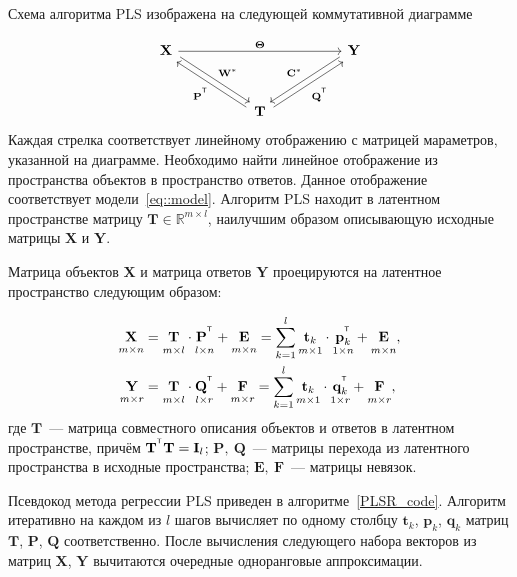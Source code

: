 \documentclass[12pt,twoside]{article}
\newcommand{\bY}{\mathbf{Y}}
\newcommand{\bX}{\mathbf{X}}
\newcommand{\bt}{\mathbf{t}}
\newcommand{\bp}{\mathbf{p}}
\newcommand{\bq}{\mathbf{q}}
\newcommand{\bP}{\mathbf{P}}
\newcommand{\bT}{\mathbf{T}}
\newcommand{\bQ}{\mathbf{Q}}
\newcommand{\bC}{\mathbf{C}}
\newcommand{\bE}{\mathbf{E}}
\newcommand{\bF}{\mathbf{F}}
\newcommand{\bW}{\mathbf{W}}
\newcommand{\bI}{\mathbf{I}}
\newcommand{\bTheta}{\boldsymbol{\Theta}}
\begin{document}
Схема алгоритма PLS изображена на следующей коммутативной диаграмме

\[
\begin{tikzcd}[column sep=5em, row sep=3em]
\bX
\arrow[]{rr}{\bTheta}
\arrow[shift left=0.5ex]{dr}{\bW^*}
& & \bY
\arrow[swap, shift right=0.5ex]{dl}{\bC^*}
\\
& \bT
\arrow[shift left=0.5ex]{ul}{\bP^{\T}}
\arrow[swap, shift right=0.5ex]{ur}{\bQ^{\T}}
\end{tikzcd}
\]
Каждая стрелка соответствует линейному отображению с матрицей мараметров, указанной на диаграмме.
Необходимо найти линейное отображение из пространства объектов в пространство ответов. 
Данное отображение соответствует модели~\eqref{eq::model}. 
Алгоритм PLS находит в латентном пространстве матрицу $\bT \in \mathbb{R}^{m \times l}$, наилучшим образом описывающую исходные матрицы $\bX$ и $\bY$.

Матрица объектов $\bX$ и матрица ответов $\bY$ проецируются на латентное пространство следующим образом:

\begin{align}
\label{eq::PLS_X}
 \underset{m \times n}{\vphantom{\bQ}\bX} 
 &= \underset{m \times l}{\vphantom{\bQ}\bT} \cdot \underset{l \times n}{\vphantom{\bQ}\bP^{\T}} + \underset{m \times n}{\vphantom{\bQ}\bE} 
 = \sum_{k=1}^l \underset{m \times 1}{\vphantom{\bp_k^{\T}}\bt_k} \cdot \underset{1 \times n}{\bp_k^{\T}} + \underset{m \times n}{\vphantom{\bp_k^{\T}}\bE},\\
 \label{eq::PLS_Y}
 \underset{m \times r}{\vphantom{\bQ}\bY} 
 &= \underset{m \times l}{\vphantom{\bQ}\bT} \cdot \underset{l \times r}{\bQ^{\T}} + \underset{m \times r}{\vphantom{\bQ}\bF}
 =  \sum_{k=1}^l  \underset{m \times 1}{\vphantom{\bq_k^{\T}}\bt_k} \cdot \underset{1 \times r}{\bq_k^{\T}} +  \underset{m \times r}{\vphantom{\bq_k^{\T}}\bF},
\end{align}
где $\bT$~--- матрица совместного описания объектов и ответов в латентном пространстве, причём $\bT^{\T} \bT = \bI_{l}$; $\bP,\ \bQ$~--- матрицы перехода из латентного пространства в  исходные пространства; $\bE,\ \bF$~--- матрицы невязок. 

Псевдокод метода регрессии PLS приведен в алгоритме~\ref{PLSR_code}. Алгоритм итеративно на каждом из $l$ шагов вычисляет по одному столбцу $\bt_k$, $\bp_k$, $\bq_k$ матриц $\bT$, $\bP$, $\bQ$ соответственно. После вычисления следующего набора векторов из матриц $\bX$, $\bY$ вычитаются очередные одноранговые аппроксимации. 
\end{document}
